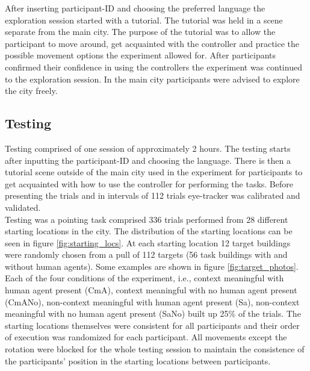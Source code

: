 After inserting participant-ID and choosing the preferred language the exploration session started with a tutorial. The tutorial was held in a scene separate from the main city. The purpose of the tutorial was to allow the participant to move around, get acquainted with the controller and practice the possible movement options the experiment allowed for. After participants confirmed their confidence in using the controllers the experiment was continued to the exploration session. In the main city participants were advised to explore the city freely.

\subsection{Testing}

Testing comprised of one session of approximately 2 hours. The testing starts after inputting the participant-ID and choosing the language. There is then a tutorial scene outside of the main city used in the experiment for participants to get acquainted with how to use the controller for performing the tasks. Before presenting the trials and in intervals of 112 trials eye-tracker was calibrated and validated. \\

Testing was a pointing task comprised 336 trials performed from 28 different starting locations in the city. The distribution of the starting locations can be seen in figure \ref{fig:starting_locs}. At each starting location 12 target buildings were randomly chosen from a pull of 112 targets (56 task buildings with and without human agents). Some examples are shown in figure \ref{fig:target_photos}. Each of the four conditions of the experiment, i.e., context meaningful with human agent present {\emphasize(CmA)}, context meaningful with no human agent present {\emphasize(CmANo)}, non-context meaningful with human agent present {\emphasize(Sa)}, non-context meaningful with no human agent present {\emphasize(SaNo)} built up 25\% of the trials.  The starting locations themselves were consistent for all participants and their order of execution was randomized for each participant. All movements except the rotation were blocked for the whole testing session to maintain the consistence of the participants' position in the starting locations between participants. \\


